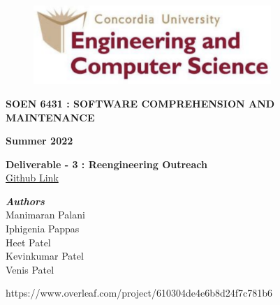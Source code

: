 \documentclass[letterpaper, 11pt]{report}
\begin{document}
\begin{titlepage}
\vspace*{0.7in}
\begin{center}
\begin{figure}[htb]
\begin{center}
\includegraphics[width=9cm]{D1-Reengineering Opportunity/images/univ_logo.png}
\end{center}
\end{figure}
\vspace*{0.3in}
\begin{Large}
\textbf{SOEN 6431 : SOFTWARE COMPREHENSION AND MAINTENANCE} \\
\end{Large}
\vspace*{0.1in}
\begin{Large}
\textbf{Summer 2022} \\
\end{Large}
\vspace*{0.9in}
\begin{Large}
\textbf{Deliverable - 3 : Reengineering Outreach} \\
\href{https://github.com/manimayan/SOEN_6431_Deja_Vu}{Github Link}\\
\end{Large}
\vspace*{0.75in}
\begin{Large}
\textbf{\emph{Authors}} \\
\vspace*{0.2in}
Manimaran Palani\\
Iphigenia Pappas\\
Heet Patel\\
Kevinkumar Patel\\
Venis Patel \\
\end{Large}
\end{center}
\begin{center}
\vspace*{0.9in}
https://www.overleaf.com/project/610304de4e6b8d24f7c781b6\end{center}
\end{titlepage}
\end{document}
